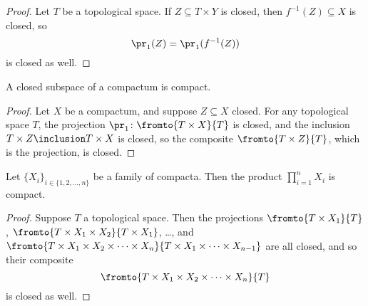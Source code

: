 \begin{proof}
	Let $T$ be a topological space.
	If $Z\subseteq T\times Y$ is closed, then $f^{-1}(Z)\subseteq X$ is closed, so%
	\[
		\pr_1(Z)=\pr_1(f^{-1}(Z))
	\]
	is closed as well.
\end{proof}

\begin{lem}
	A closed subspace of a compactum is compact.
\end{lem}

\begin{proof}
	Let $X$ be a compactum, and suppose $Z\subseteq X$ closed.
	For any topological space $T$, the projection $\pr_1\colon\fromto{T\times X}{T}$ is closed, and
	the inclusion $T\times Z \inclusion T\times X$ is closed, so the composite $\fromto{T\times Z}{T}$, which is the projection, is closed.
\end{proof}

\begin{prp}%
	Let $\{X_i\}_{i\in\{1,2,\dots,n\}}$ be a family of compacta.
	Then the product $\prod_{i=1}^nX_i$ is compact.
\end{prp}

\begin{proof}
	Suppose $T$ a topological space.
	Then the projections $\fromto{T\times X_1}{T}$, $\fromto{T\times X_1\times X_2}{T\times X_1}$, \ldots, and $\fromto{T\times X_1\times X_2\times\cdots\times X_n}{T\times X_1\times\cdots\times X_{n-1}}$ are all closed, and so their composite
	\[
		\fromto{T\times X_1\times X_2\times\cdots\times X_n}{T}
	\]
	is closed as well.
\end{proof}

